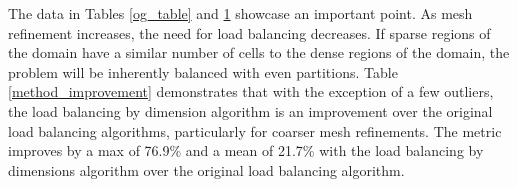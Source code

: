 \documentclass[letterpaper]{mandc2019}
\begin{document}
{\begin{table}[!htb]
{\begin{tabular}{c|c|c|c|c|c|c|c|c|c}
\end{tabular}}
\label{all_improvements}
\end{table}

The data in Tables \ref{og_table} and \ref{all_improvements} showcase an important point. As mesh refinement increases, the need for load balancing decreases. If sparse regions of the domain have a similar number of cells to the dense regions of the domain, the problem will be inherently balanced with even partitions. Table \ref{method_improvement} demonstrates that with the exception of a few outliers, the load balancing by dimension algorithm is an improvement over the original load balancing algorithms, particularly for coarser mesh refinements. The metric improves by a max of 76.9\% and a mean of 21.7\%  with the load balancing by dimensions algorithm over the original load balancing algorithm.

}
\end{document}
